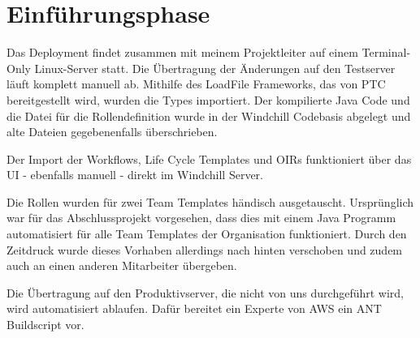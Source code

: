\section{Einführungsphase}
\label{sec:Einfuehrungsphase}

Das Deployment findet zusammen mit meinem Projektleiter auf einem Terminal-Only Linux-Server statt.
Die Übertragung der Änderungen auf den Testserver läuft komplett manuell ab.
Mithilfe des LoadFile Frameworks, das von PTC bereitgestellt wird, wurden die Types importiert.
Der kompilierte Java Code und die Datei für die Rollendefinition wurde in der Windchill Codebasis abgelegt und alte Dateien gegebenenfalls überschrieben.


Der Import der Workflows, Life Cycle Templates und OIRs funktioniert über das UI - ebenfalls manuell - direkt im Windchill Server.

Die Rollen wurden für zwei Team Templates händisch ausgetauscht.
Ursprünglich war für das Abschlussprojekt vorgesehen, dass dies mit einem Java Programm automatisiert für alle Team Templates der Organisation funktioniert.
Durch den Zeitdruck wurde dieses Vorhaben allerdings nach hinten verschoben und zudem auch an einen anderen Mitarbeiter übergeben.

Die Übertragung auf den Produktivserver, die nicht von uns durchgeführt wird, wird automatisiert ablaufen.
Dafür bereitet ein Experte von AWS ein ANT Buildscript vor.

